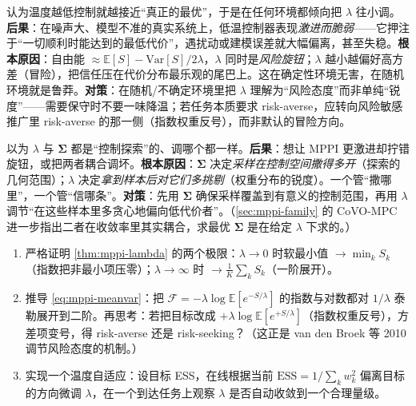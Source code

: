 \begin{pitfall}
认为温度越低控制就越接近“真正的最优”，于是在任何环境都倾向把 $\lambda$ 往小调。\textbf{后果}：在噪声大、模型不准的真实系统上，低温控制器表现\emph{激进而脆弱}——它押注于“一切顺利时能达到的最低代价”，遇扰动或建模误差就大幅偏离，甚至失稳。\textbf{根本原因}：自由能 $\approx\mathbb{E}[S]-\mathrm{Var}[S]/2\lambda$，$\lambda$ 同时是\emph{风险旋钮}；$\lambda$ 越小越偏好高方差（冒险），把信任压在代价分布最乐观的尾巴上。这在确定性环境无害，在随机环境就是鲁莽。\textbf{对策}：在随机/不确定环境里把 $\lambda$ 理解为“风险态度”而非单纯“锐度”——需要保守时不要一味降温；若任务本质要求 risk-averse，应转向风险敏感推广里 risk-averse 的那一侧（指数权重反号），而非默认的冒险方向。
\end{pitfall}

\begin{pitfall}
以为 $\lambda$ 与 $\boldsymbol{\Sigma}$ 都是“控制探索”的、调哪个都一样。\textbf{后果}：想让 MPPI 更激进却拧错旋钮，或把两者耦合调坏。\textbf{根本原因}：$\boldsymbol{\Sigma}$ 决定\emph{采样在控制空间撒得多开}（探索的几何范围）；$\lambda$ 决定\emph{拿到样本后对它们多挑剔}（权重分布的锐度）。一个管“撒哪里”，一个管“信哪条”。\textbf{对策}：先用 $\boldsymbol{\Sigma}$ 确保采样覆盖到有意义的控制范围，再用 $\lambda$ 调节“在这些样本里多贪心地偏向低代价者”。（\cref{sec:mppi-family} 的 CoVO-MPC 进一步指出二者在收敛率里其实耦合，求最优 $\boldsymbol{\Sigma}$ 是在给定 $\lambda$ 下求的。）
\end{pitfall}

\begin{practice}
\begin{enumerate}
  \item 严格证明 \cref{thm:mppi-lambda} 的两个极限：$\lambda\to0$ 时软最小值 $\to\min_k S_k$（指数把非最小项压零）；$\lambda\to\infty$ 时 $\to\frac1K\sum_k S_k$（一阶展开）。
  \item 推导 \cref{eq:mppi-meanvar}：把 $\mathcal{F}=-\lambda\log\mathbb{E}[e^{-S/\lambda}]$ 的指数与对数都对 $1/\lambda$ 泰勒展开到二阶。再思考：若把目标改成 $+\lambda\log\mathbb{E}[e^{+S/\lambda}]$（指数权重反号），方差项变号，得 risk-averse 还是 risk-seeking？（这正是 van den Broek 等 2010 调节风险态度的机制。）
  \item 实现一个温度自适应：设目标 ESS，在线根据当前 $\mathrm{ESS}=1/\sum_k w_k^2$ 偏离目标的方向微调 $\lambda$，在一个到达任务上观察 $\lambda$ 是否自动收敛到一个合理量级。
\end{enumerate}
\end{practice}

